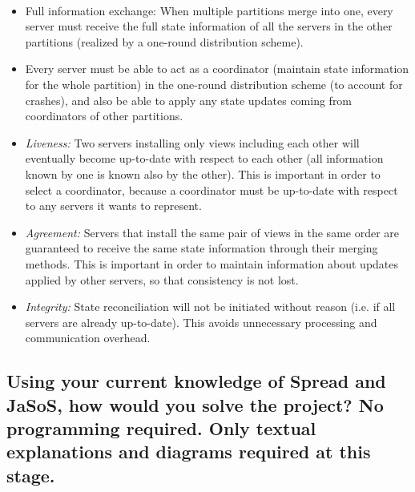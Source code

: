 \documentclass[a4paper,11pt]{article}
\begin{document}
\paragraph{}
\begin{itemize}
	\item Full information exchange: When multiple partitions merge into one, every server must receive the full state information of all the servers in the other partitions (realized by a one-round distribution scheme).
	\item Every server must be able to act as a coordinator (maintain state information for the whole partition) in the one-round distribution scheme (to account for crashes), and also be able to apply any state updates coming from coordinators of other partitions.
	\item \textit{Liveness:} Two servers installing only views including each other will eventually become up-to-date with respect to each other (all information known by one is known also by the other). This is important in order to select a coordinator, because a coordinator must be up-to-date with respect to any servers it wants to represent.
	\item \textit{Agreement:} Servers that install the same pair of views in the same order are guaranteed to receive the same state information through their merging methods. This is important in order to maintain information about updates applied by other servers, so that consistency is not lost.
	\item \textit{Integrity:} State reconciliation will not be initiated without reason (i.e. if all servers are already up-to-date). This avoids unnecessary processing and communication overhead. 
\end{itemize}

\subsection{
Using your current knowledge of Spread and JaSoS, how would you solve the project? No programming required.
Only textual explanations and diagrams required at this stage.
}
\end{document}
